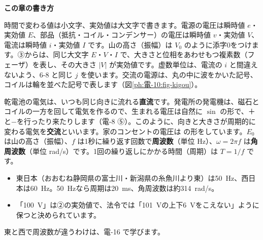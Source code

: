 \noindent\textbf{この章の書き方}\par\nobreak
時間で変わる値は小文字、実効値は大文字で書きます。電源の電圧は瞬時値 $e$・実効値 $E$、部品（抵抗・コイル・コンデンサー）の電圧は瞬時値 $v$・実効値 $V$、電流は瞬時値 $i$・実効値 $I$ です。山の高さ（振幅）は $V_0$ のように添字0をつけます。③からは、同じ大文字 $E$・$V$・$I$ で、大きさと位相をあわせもつ複素数（フェーザ）を表し、その大きさ $\lvert V\rvert$ が実効値です。虚数単位は、電流の $i$ と間違えないよう、6-8 と同じ $j$ を使います。交流の電源は、丸の中に波をかいた記号、コイルは輪を並べた記号で表します（図\ref{ph:電-10:fig-kigou}）。

\begin{bkfigure}
\label{ph:電-10:fig-kigou}
\end{bkfigure}



\leavevmode\label{ph:電-10:sec1}乾電池の電気は、いつも同じ向きに流れる\textbf{直流}です。発電所の発電機は、磁石とコイルの一方を回して電気を作るので、生まれる電圧は自然に $\sin$ の形で、＋と−を行ったり来たりします（電-8 ⑤）。このように、向きと大きさが周期的に変わる電気を\textbf{交流}といいます。家のコンセントの電圧は
\label{ph:電-10:sec1eq}の形をしています。$E_0$ は山の高さ（振幅）、$f$ は1秒に繰り返す回数で\textbf{周波数}（単位 Hz）、$\omega=2\pi f$ は\textbf{角周波数}（単位 rad/s）です。1回の繰り返しにかかる時間（周期）は $T=1/f$ です。
\begin{itemize}[leftmargin=1.2\zw, itemsep=2pt, topsep=2pt, label={\color{bkTheme}●}]
\item 東日本（おおむね静岡県の富士川・新潟県の糸魚川より東）は\qty{50}{Hz}、西日本は\qty{60}{Hz}。\qty{50}{Hz}なら周期は\qty{20}{ms}、角周波数は約\qty{314}{rad/s}。
\item 「\qty{100}{V}」は②の実効値で、法令では「\qty{101}{V}の上下\qty{6}{V}をこえない」ように保つと決められています。
\end{itemize}
東と西で周波数が違うわけは、電-16 で学びます。

